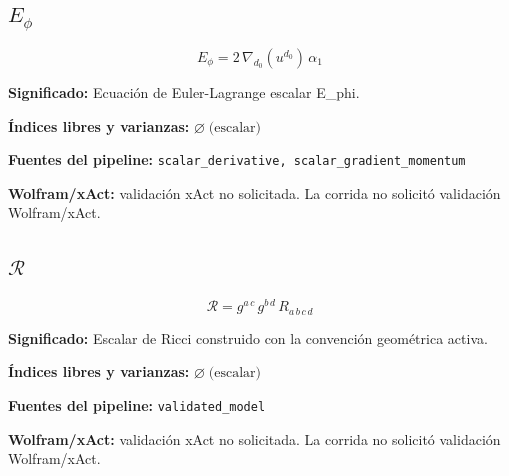 \documentclass[11pt]{article}
\begin{document}
\subsection*{$ E_{\phi} $}
\begin{dmath*}[breakdepth={5}]
E_{\phi} = 2\,\nabla_{d_{0}}\!\left(u{}^{d_{0}}\right)\,\alpha_{1}
\end{dmath*}
\par\vspace{1.2\baselineskip}\noindent
\begin{minipage}{\linewidth}
\textbf{Significado:} Ecuación de Euler-Lagrange escalar E\_phi.\par
\textbf{Índices libres y varianzas:} $ \varnothing\;\text{(escalar)} $\par
\textbf{Fuentes del pipeline:} \texttt{scalar\_derivative, scalar\_gradient\_momentum}\par
\textbf{Wolfram/xAct:} validación xAct no solicitada. La corrida no solicitó validación Wolfram/xAct.\par
\end{minipage}
\subsection*{$ \mathcal{R} $}
\begin{dmath*}[breakdepth={5}]
\mathcal{R} = g{}^{a\,c}\,g{}^{b\,d}\,R{}_{a\,b\,c\,d}
\end{dmath*}
\par\vspace{1.2\baselineskip}\noindent
\begin{minipage}{\linewidth}
\textbf{Significado:} Escalar de Ricci construido con la convención geométrica activa.\par
\textbf{Índices libres y varianzas:} $ \varnothing\;\text{(escalar)} $\par
\textbf{Fuentes del pipeline:} \texttt{validated\_model}\par
\textbf{Wolfram/xAct:} validación xAct no solicitada. La corrida no solicitó validación Wolfram/xAct.\par
\end{minipage}
\end{document}

